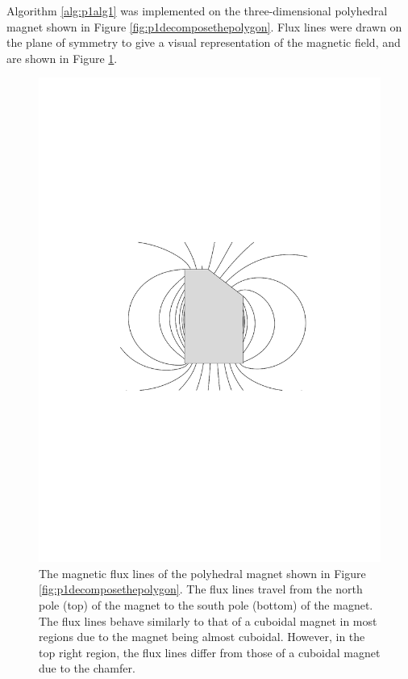 Algorithm \ref{alg:p1alg1} was implemented on the three-dimensional polyhedral magnet shown in Figure \ref{fig:p1decomposethepolygon}. Flux lines were drawn on the plane of symmetry to give a visual representation of the magnetic field, and are shown in Figure \ref{fig:p1fluxlines}.
\begin{figure}
	\centering
	\includegraphics[trim = 3cm 10cm 3cm 10cm,width=0.8\linewidth]{p1/p1FIG2}
	\caption{The magnetic flux lines of the polyhedral magnet shown in Figure \ref{fig:p1decomposethepolygon}. The flux lines travel from the north pole (top) of the magnet to the south pole (bottom) of the magnet. The flux lines behave similarly to that of a cuboidal magnet in most regions due to the magnet being almost cuboidal. However, in the top right region, the flux lines differ from those of a cuboidal magnet due to the chamfer.}
	\label{fig:p1fluxlines}
\end{figure}

